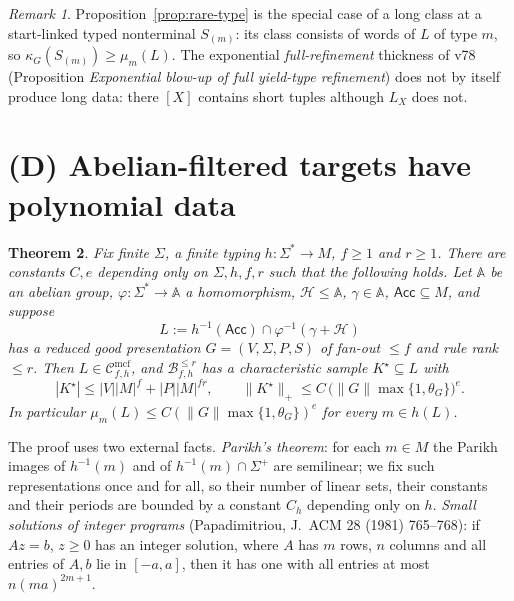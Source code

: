 \documentclass[11pt]{article}
\newtheorem{theorem}{Theorem}
\theoremstyle{definition}
\theoremstyle{remark}
\newtheorem{remark}[theorem]{Remark}
\newcommand{\Cmcf}[2]{\mathcal{C}^{\mathrm{mcf}}_{#1,#2}}
\newcommand{\B}{\mathcal B}
\begin{document}
\begin{remark}
Proposition~\ref{prop:rare-type} is the special case of a long class at
a start-linked typed nonterminal $S_{(m)}$: its class consists of words of
$L$ of type $m$, so $\kappa_G(S_{(m)})\ge\mu_m(L)$.  The exponential
\emph{full-refinement} thickness of v78 (Proposition \emph{Exponential
blow-up of full yield-type refinement}) does not by itself produce long
data: there $[X]$ contains short tuples although $L_X$ does not.
\end{remark}

\section{(D) Abelian-filtered targets have polynomial data}

\begin{theorem}\label{thm:abelian-poly}
Fix finite $\Sigma$, a finite typing $h:\Sigma^*\to M$, $f\ge1$ and
$r\ge1$.  There are constants $C,e$ depending only on $\Sigma,h,f,r$ such
that the following holds.  Let $\mathbb A$ be an abelian group,
$\varphi:\Sigma^*\to\mathbb A$ a homomorphism, $\mathcal H\le\mathbb A$,
$\gamma\in\mathbb A$, $\mathsf{Acc}\subseteq M$, and suppose
\[
 L:=h^{-1}(\mathsf{Acc})\cap\varphi^{-1}(\gamma+\mathcal H)
\]
has a reduced good presentation $G=(V,\Sigma,P,S)$ of fan-out $\le f$ and
rule rank $\le r$.  Then $L\in\Cmcf{f}{h}$, and $\B^{\le r}_{f,h}$ has a
characteristic sample $K^\star\subseteq L$ with
\[
 |K^\star|\le|V||M|^f+|P||M|^{fr},
 \qquad
 \|K^\star\|_+\le C\,\bigl(\|G\|\max\{1,\theta_G\}\bigr)^{e}.
\]
In particular $\mu_m(L)\le C(\|G\|\max\{1,\theta_G\})^e$ for every
$m\in h(L)$.
\end{theorem}

The proof uses two external facts.  \emph{Parikh's theorem}: for each
$m\in M$ the Parikh images of $h^{-1}(m)$ and of $h^{-1}(m)\cap\Sigma^+$
are semilinear; we fix such representations once and for all, so their
number of linear sets, their constants and their periods are bounded by a
constant $C_h$ depending only on $h$.  \emph{Small solutions of integer
programs} (Papadimitriou, J.~ACM 28 (1981) 765--768): if $Az=b$, $z\ge0$
has an integer solution, where $A$ has $m$ rows, $n$ columns and all
entries of $A,b$ lie in $[-a,a]$, then it has one with all entries at most
$n(ma)^{2m+1}$.
\end{document}
